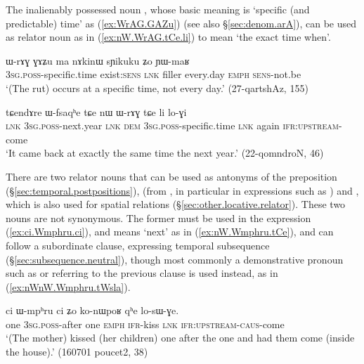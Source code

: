The inalienably possessed noun , whose basic meaning is `specific (and predictable) time' as (\ref{ex:WrAG.GAZu}) (see also §\ref{sec:denom.arA}), can be used as relator noun as in (\ref{ex:nW.WrAG.tCe.li}) to mean `the exact time when'.

\begin{exe}
\ex \label{ex:WrAG.GAZu}
\gll ɯ-rɤɣ ɣɤʑu ma nɤkinɯ sɲikuku ʑo ɲɯ-maʁ \\
\textsc{3sg}.\textsc{poss}-specific.time exist:\textsc{sens} \textsc{lnk} filler every.day \textsc{emph} \textsc{sens}-not.be \\
\glt `(The rut) occurs at a specific time, not every day.' (27-qartshAz, 155)
\end{exe}

\begin{exe}
\ex \label{ex:nW.WrAG.tCe.li}
\gll tɕendɤre ɯ-fsaqʰe tɕe nɯ ɯ-rɤɣ tɕe li lo-ɣi \\
\textsc{lnk} \textsc{3sg}.\textsc{poss}-next.year \textsc{lnk} \textsc{dem}  \textsc{3sg}.\textsc{poss}-specific.time \textsc{lnk} again \textsc{ifr}:\textsc{upstream}-come \\
\glt `It came back at exactly the same time the next year.' (22-qomndroN, 46)
\end{exe}


There are two relator nouns that can be used as antonyms of the preposition  (§\ref{sec:temporal.postpositions}),   (from , in particular in expressions such as ) and , which is also used for spatial relations (§\ref{sec:other.locative.relator}). These two nouns are not synonymous. The former must be used in the expression  (\ref{ex:ci.Wmphru.ci}), and means `next' as in (\ref{ex:nW.Wmphru.tCe}), and can follow a subordinate clause, expressing temporal subsequence (§\ref{sec:subsequence.neutral}), though most commonly a demonstrative pronoun such as  or  referring to the previous clause is used instead, as in (\ref{ex:nWnW.Wmphru.tWsla}).

\begin{exe}
\ex \label{ex:ci.Wmphru.ci}
 \gll ci ɯ-mpʰru ci ʑo ko-nɯpoʁ qʰe lo-sɯ-ɣe. \\
 one \textsc{3sg}.\textsc{poss}-after one \textsc{emph} \textsc{ifr}-kiss \textsc{lnk} \textsc{ifr}:\textsc{upstream}-\textsc{caus}-come  \\
\glt `(The mother) kissed (her children) one after the one and had them come (inside the house).' (160701 poucet2, 38)
\end{exe}


